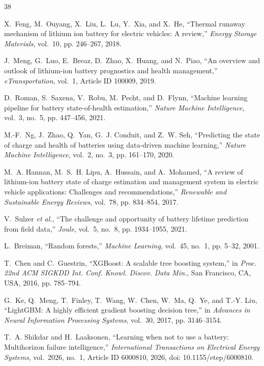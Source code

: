 \documentclass[11pt,a4paper]{article}
\begin{document}
\begin{thebibliography}{38}

X.~Feng, M.~Ouyang, X.~Liu, L.~Lu, Y.~Xia, and X.~He, ``Thermal runaway mechanism of lithium ion battery for electric vehicles: A review,'' \emph{Energy Storage Materials}, vol.~10, pp. 246--267, 2018.

J.~Meng, G.~Luo, E.~Breaz, D.~Zhao, X.~Huang, and N.~Piao, ``An overview and outlook of lithium-ion battery prognostics and health management,'' \emph{eTransportation}, vol.~1, Article ID 100009, 2019.

D.~Roman, S.~Saxena, V.~Robu, M.~Pecht, and D.~Flynn, ``Machine learning pipeline for battery state-of-health estimation,'' \emph{Nature Machine Intelligence}, vol.~3, no.~5, pp. 447--456, 2021.

M.-F.~Ng, J.~Zhao, Q.~Yan, G.~J. Conduit, and Z.~W. Seh, ``Predicting the state of charge and health of batteries using data-driven machine learning,'' \emph{Nature Machine Intelligence}, vol.~2, no.~3, pp. 161--170, 2020.

M.~A. Hannan, M.~S.~H. Lipu, A.~Hussain, and A.~Mohamed, ``A review of lithium-ion battery state of charge estimation and management system in electric vehicle applications: Challenges and recommendations,'' \emph{Renewable and Sustainable Energy Reviews}, vol.~78, pp. 834--854, 2017.

V.~Sulzer \emph{et al.}, ``The challenge and opportunity of battery lifetime prediction from field data,'' \emph{Joule}, vol.~5, no.~8, pp. 1934--1955, 2021.

L.~Breiman, ``Random forests,'' \emph{Machine Learning}, vol.~45, no.~1, pp. 5--32, 2001.

T.~Chen and C.~Guestrin, ``XGBoost: A scalable tree boosting system,'' in \emph{Proc. 22nd ACM SIGKDD Int. Conf. Knowl. Discov. Data Min.}, San Francisco, CA, USA, 2016, pp. 785--794.

G.~Ke, Q.~Meng, T.~Finley, T.~Wang, W.~Chen, W.~Ma, Q.~Ye, and T.-Y. Liu, ``LightGBM: A highly efficient gradient boosting decision tree,'' in \emph{Advances in Neural Information Processing Systems}, vol.~30, 2017, pp. 3146--3154.

T.~A. Shikdar and H.~Laaksonen, ``Learning when not to use a battery: Multihorizon failure intelligence,'' \emph{International Transactions on Electrical Energy Systems}, vol.~2026, no.~1, Article ID 6000810, 2026, doi: 10.1155/etep/6000810.


\end{thebibliography}
\end{document}
